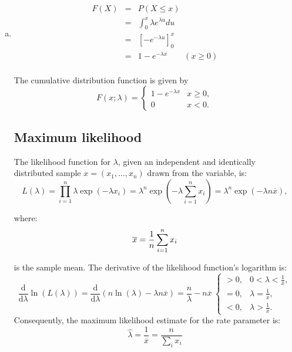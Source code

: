 \documentclass[a4paper,12pt]{article}
\begin{document}
\begin{enumerate}[(a)]
 \item 
 
\begin{eqnarray*}
F(X) &=& P(X \leq x) \\ &=& \int^{x}_{0} \lambda e^{\lambda u} du\\
 &=& \left[-e^{-\lambda u}\right]^{x}_{0} \\ &=& 1-e^{-\lambda x} \qquad (x \geq  0)\\
\end{eqnarray*}

The cumulative distribution function is given by 
\[ {\displaystyle F(x;\lambda )={\begin{cases}1-e^{-\lambda x}&x\geq 0,\\0&x<0.\end{cases}}} \]


\newpage
\subsection*{Maximum likelihood}
The likelihood function for $\lambda$, given an independent and identically distributed sample $x = (x_1, \ldots, x_n)$ drawn from the variable, is: 
\[ {\displaystyle L(\lambda )=\prod _{i=1}^{n}\lambda \exp(-\lambda x_{i})=\lambda ^{n}\exp \left(-\lambda \sum _{i=1}^{n}x_{i}\right)=\lambda ^{n}\exp \left(-\lambda n{\overline {x}}\right),} \]

where: 
\[ {\displaystyle {\overline {x}}={1 \over n}\sum _{i=1}^{n}x_{i}} \]

is the sample mean. 
The derivative of the likelihood function's logarithm is: 
\[ {\displaystyle {\frac {\mathrm {d} }{\mathrm {d} \lambda }}\ln(L(\lambda ))={\frac {\mathrm {d} }{\mathrm {d} \lambda }}\left(n\ln(\lambda )-\lambda n{\overline {x}}\right)={\frac {n}{\lambda }}-n{\overline {x}}\ {\begin{cases}>0,&0<\lambda <{\frac {1}{\overline {x}}},\\[8pt]=0,&\lambda ={\frac {1}{\overline {x}}},\\[8pt]<0,&\lambda >{\frac {1}{\overline {x}}}.\end{cases}}} 
\]
Consequently, the maximum likelihood estimate for the rate parameter is: 
\[ {\displaystyle {\widehat {\lambda }}={\frac {1}{\overline {x}}}={\frac {n}{\sum _{i}x_{i}}}} \]


\end{enumerate}
\end{document}
